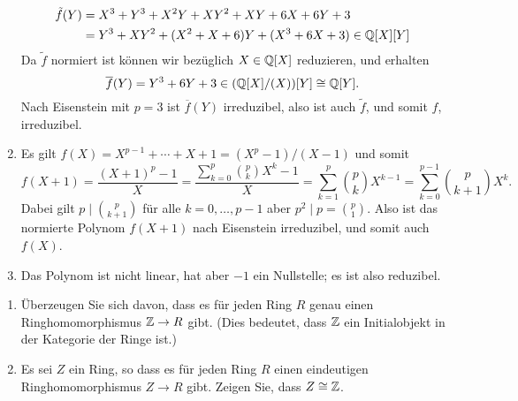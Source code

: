 \begin{solution}
\begin{enumerate}
\begin{align*}
            \tilde{f}(Y)
        &=  X^3 + Y^3 + X^2 Y + X Y^2 + X Y + 6 X + 6 Y + 3
        \\
        &=  Y^3 + X Y^2 + (X^2 + X + 6) Y + (X^3 + 6X + 3)
        \in \mathbb{Q}[X][Y]
      \end{align*}
      Da $\tilde{f}$ normiert ist können wir bezüglich $X \in \mathbb{Q}[X]$ reduzieren, und erhalten
      \[
              \overline{f}(Y)
        =     Y^3 + 6 Y + 3
        \in   (\mathbb{Q}[X]/(X))[Y]
        \cong \mathbb{Q}[Y].
      \]
      Nach Eisenstein mit $p = 3$ ist $\overline{f}(Y)$ irreduzibel, also ist auch $\tilde{f}$, und somit $f$, irreduzibel.
    \item
      Es gilt $f(X) = X^{p-1} + \dotsb + X + 1 = (X^p - 1)/(X - 1)$ und somit
      \[
          f(X+1)
        = \frac{(X+1)^p-1}{X}
        = \frac{\sum_{k=0}^p \binom{p}{k} X^k - 1}{X}
        = \sum_{k=1}^p \binom{p}{k} X^{k-1}
        = \sum_{k=0}^{p-1} \binom{p}{k+1} X^k.
      \]
      Dabei gilt $p \mid \binom{p}{k+1}$ für alle $k = 0, \dotsc, p-1$ aber $p^2 \mid p = \binom{p}{1}$.
      Also ist das normierte Polynom $f(X+1)$ nach Eisenstein irreduzibel, und somit auch $f(X)$.
    \item
      Das Polynom ist nicht linear, hat aber $-1$ ein Nullstelle; es ist also reduzibel.
  \end{enumerate}
\end{solution}


\begin{question}[subtitle = Initialobjekte in der Kategorie der Ringe]
  \label{qst: Z is inital}
  \begin{enumerate}
    \item
      Überzeugen Sie sich davon, dass es für jeden Ring $R$ genau einen Ringhomomorphismus $\mathbb{Z} \to R$ gibt.
      (Dies bedeutet, dass $\mathbb{Z}$ ein Initialobjekt in der Kategorie der Ringe ist.)
    \item
      Es sei $Z$ ein Ring, so dass es für jeden Ring $R$ einen eindeutigen Ringhomomorphismus $Z \to R$ gibt.
      Zeigen Sie, dass $Z \cong \mathbb{Z}$.
  \end{enumerate}
\end{question}


